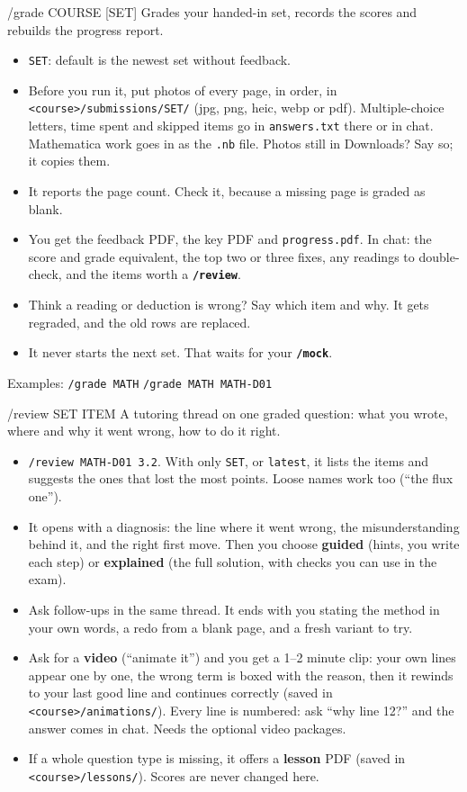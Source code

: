 \documentclass[a4paper,10pt]{article}
\newcommand{\cmd}[1]{\texttt{\bfseries #1}}
\newcommand{\argx}[1]{\texttt{\color{accent}#1}}
\begin{document}
\begin{card}{/grade COURSE [SET]}
Grades your handed-in set, records the scores and rebuilds the progress report.
\begin{itemize}
  \item \argx{SET}: default is the newest set without feedback.
  \item Before you run it, put photos of every page, in order, in
    \texttt{<course>/submissions/SET/} (jpg, png, heic, webp or pdf). Multiple-choice letters,
    time spent and skipped items go in \texttt{answers.txt} there or in chat.
    Mathematica work goes in as the \texttt{.nb} file. Photos still in Downloads? Say so; it copies them.
  \item It reports the page count. Check it, because a missing page is graded as blank.
  \item You get the feedback PDF, the key PDF and \texttt{progress.pdf}. In chat: the score and
    grade equivalent, the top two or three fixes, any readings to double-check, and the items worth a \cmd{/review}.
  \item Think a reading or deduction is wrong? Say which item and why. It gets regraded, and the old rows are replaced.
  \item It never starts the next set. That waits for your \cmd{/mock}.
\end{itemize}
{\small\color{muted} Examples: \texttt{/grade MATH} \quad \texttt{/grade MATH MATH-D01}}
\end{card}

\begin{card}{/review SET ITEM}
A tutoring thread on one graded question: what you wrote, where and why it went wrong, how to do it right.
\begin{itemize}
  \item \texttt{/review MATH-D01 3.2}. With only \argx{SET}, or \texttt{latest}, it lists the items and
    suggests the ones that lost the most points. Loose names work too (``the flux one'').
  \item It opens with a diagnosis: the line where it went wrong, the misunderstanding behind it,
    and the right first move. Then you choose \textbf{guided} (hints, you write each step) or
    \textbf{explained} (the full solution, with checks you can use in the exam).
  \item Ask follow-ups in the same thread. It ends with you stating the method in your own words,
    a redo from a blank page, and a fresh variant to try.
  \item Ask for a \textbf{video} (``animate it'') and you get a 1--2 minute clip: your own lines
    appear one by one, the wrong term is boxed with the reason, then it rewinds to your last good
    line and continues correctly (saved in \texttt{<course>/animations/}). Every line is numbered:
    ask ``why line 12?'' and the answer comes in chat. Needs the optional video packages.
  \item If a whole question type is missing, it offers a \textbf{lesson} PDF (saved in \texttt{<course>/lessons/}).
    Scores are never changed here.
\end{itemize}
\end{card}
\end{document}

